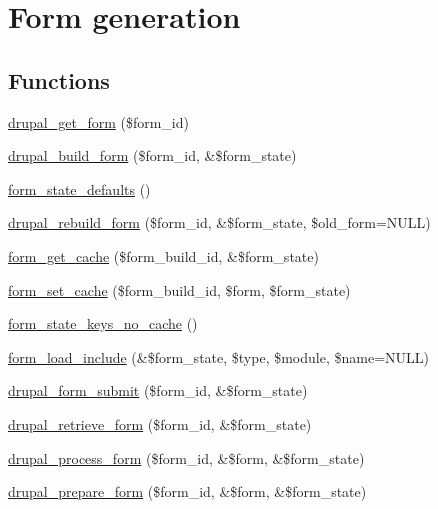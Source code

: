 \hypertarget{group__form__api}{
\section{Form generation}
\label{group__form__api}
}
\subsection*{Functions}
\begin{DoxyCompactItemize}
\item 
\hyperlink{group__form__api_ga720df81a837b06dfe19daf1c1eea3437}{drupal\_\-get\_\-form} (\$form\_\-id)
\item 
\hyperlink{group__form__api_gabead4b3c089fd605421d371a0315c4d7}{drupal\_\-build\_\-form} (\$form\_\-id, \&\$form\_\-state)
\item 
\hyperlink{group__form__api_ga398705411ef7b0f88e08253a56683987}{form\_\-state\_\-defaults} ()
\item 
\hyperlink{group__form__api_ga72bc81db2eb72bbb1249a7c50d8614e7}{drupal\_\-rebuild\_\-form} (\$form\_\-id, \&\$form\_\-state, \$old\_\-form=NULL)
\item 
\hyperlink{group__form__api_gab1da3001a3773a949188b52f61a9cd09}{form\_\-get\_\-cache} (\$form\_\-build\_\-id, \&\$form\_\-state)
\item 
\hyperlink{group__form__api_ga274fe9a7fe000a43b7f173e3b54dae7f}{form\_\-set\_\-cache} (\$form\_\-build\_\-id, \$form, \$form\_\-state)
\item 
\hyperlink{group__form__api_gabffb5c6a1218bb14db316fe29c4e52af}{form\_\-state\_\-keys\_\-no\_\-cache} ()
\item 
\hyperlink{group__form__api_ga9c29fd030cf29d55e40f849de8dde040}{form\_\-load\_\-include} (\&\$form\_\-state, \$type, \$module, \$name=NULL)
\item 
\hyperlink{group__form__api_ga4312d7fe0602f6359153fc62cba1ca24}{drupal\_\-form\_\-submit} (\$form\_\-id, \&\$form\_\-state)
\item 
\hyperlink{group__form__api_ga82f16e1c86833aa88bf93adf93bae9bb}{drupal\_\-retrieve\_\-form} (\$form\_\-id, \&\$form\_\-state)
\item 
\hyperlink{group__form__api_ga61186f5c43533761544a778918818fd2}{drupal\_\-process\_\-form} (\$form\_\-id, \&\$form, \&\$form\_\-state)
\item 
\hyperlink{group__form__api_ga79309515217249c16c7e4a7117141120}{drupal\_\-prepare\_\-form} (\$form\_\-id, \&\$form, \&\$form\_\-state)
\item 

\end{DoxyCompactItemize}
